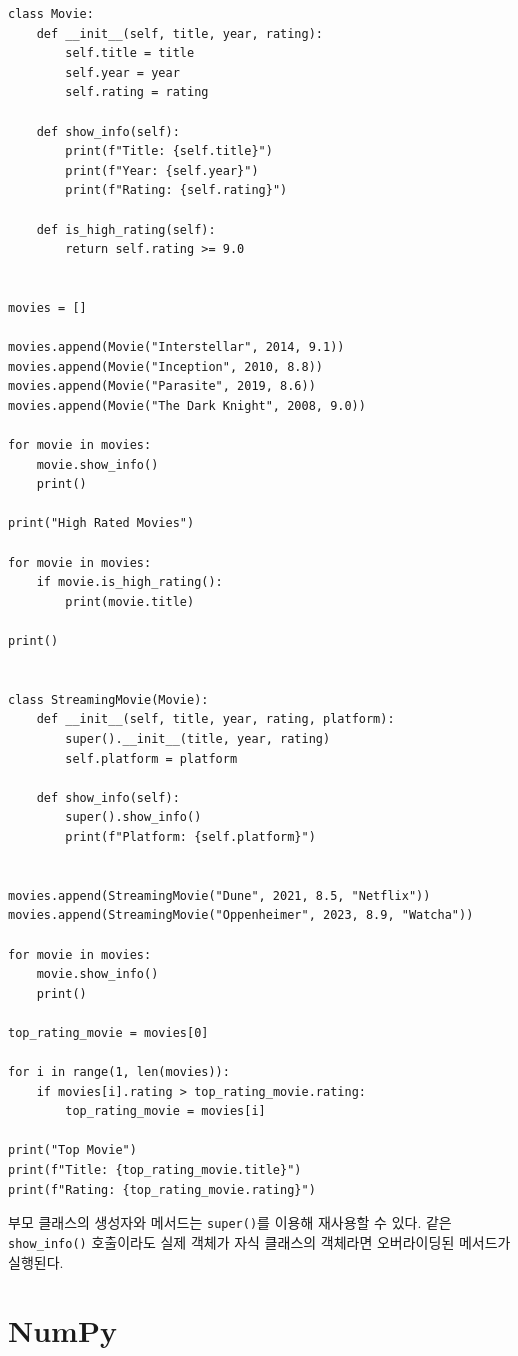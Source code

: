 \documentclass[11pt,a4paper]{article}
\begin{document}
\begin{lstlisting}
class Movie:
    def __init__(self, title, year, rating):
        self.title = title
        self.year = year
        self.rating = rating

    def show_info(self):
        print(f"Title: {self.title}")
        print(f"Year: {self.year}")
        print(f"Rating: {self.rating}")

    def is_high_rating(self):
        return self.rating >= 9.0


movies = []

movies.append(Movie("Interstellar", 2014, 9.1))
movies.append(Movie("Inception", 2010, 8.8))
movies.append(Movie("Parasite", 2019, 8.6))
movies.append(Movie("The Dark Knight", 2008, 9.0))

for movie in movies:
    movie.show_info()
    print()

print("High Rated Movies")

for movie in movies:
    if movie.is_high_rating():
        print(movie.title)

print()


class StreamingMovie(Movie):
    def __init__(self, title, year, rating, platform):
        super().__init__(title, year, rating)
        self.platform = platform

    def show_info(self):
        super().show_info()
        print(f"Platform: {self.platform}")


movies.append(StreamingMovie("Dune", 2021, 8.5, "Netflix"))
movies.append(StreamingMovie("Oppenheimer", 2023, 8.9, "Watcha"))

for movie in movies:
    movie.show_info()
    print()

top_rating_movie = movies[0]

for i in range(1, len(movies)):
    if movies[i].rating > top_rating_movie.rating:
        top_rating_movie = movies[i]

print("Top Movie")
print(f"Title: {top_rating_movie.title}")
print(f"Rating: {top_rating_movie.rating}")
\end{lstlisting}

\begin{importantbox}
부모 클래스의 생성자와 메서드는 \texttt{super()}를 이용해 재사용할 수 있다.
같은 \texttt{show\_info()} 호출이라도 실제 객체가 자식 클래스의 객체라면 오버라이딩된 메서드가 실행된다.
\end{importantbox}

\section{NumPy}
\end{document}
